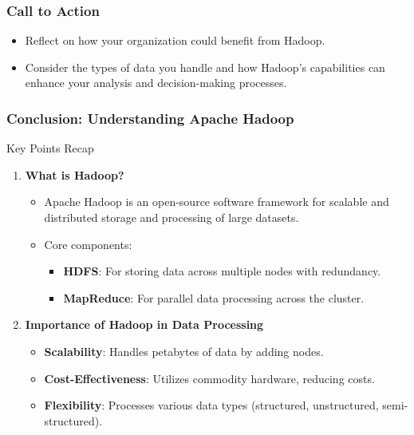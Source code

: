 \documentclass[aspectratio=169]{beamer}
\begin{document}
\begin{frame}[fragile]
    \frametitle{Call to Action}
    \begin{itemize}
        \item Reflect on how your organization could benefit from Hadoop.
        \item Consider the types of data you handle and how Hadoop’s capabilities can enhance your analysis and decision-making processes.
    \end{itemize}
\end{frame}

\begin{frame}[fragile]
    \frametitle{Conclusion: Understanding Apache Hadoop}
    \begin{block}{Key Points Recap}
        \begin{enumerate}
            \item \textbf{What is Hadoop?}
                \begin{itemize}
                    \item Apache Hadoop is an open-source software framework for scalable and distributed storage and processing of large datasets.
                    \item Core components:
                        \begin{itemize}
                            \item \textbf{HDFS}: For storing data across multiple nodes with redundancy.
                            \item \textbf{MapReduce}: For parallel data processing across the cluster.
                        \end{itemize}
                \end{itemize}
            \item \textbf{Importance of Hadoop in Data Processing}
                \begin{itemize}
                    \item \textbf{Scalability}: Handles petabytes of data by adding nodes.
                    \item \textbf{Cost-Effectiveness}: Utilizes commodity hardware, reducing costs.
                    \item \textbf{Flexibility}: Processes various data types (structured, unstructured, semi-structured).
                \end{itemize}
        \end{enumerate}
    \end{block}
\end{frame}
\end{document}
